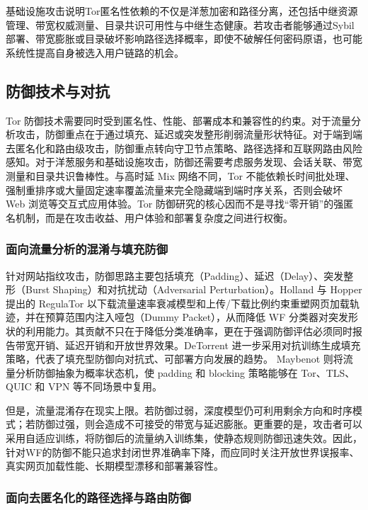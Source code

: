 基础设施攻击说明Tor匿名性依赖的不仅是洋葱加密和路径分离，还包括中继资源管理、带宽权威测量、目录共识可用性与中继生态健康。若攻击者能够通过Sybil部署、带宽膨胀或目录破坏影响路径选择概率，即使不破解任何密码原语，也可能系统性提高自身被选入用户链路的机会。

\subsection{防御技术与对抗}

Tor 防御技术需要同时受到匿名性、性能、部署成本和兼容性的约束。对于流量分析攻击，防御重点在于通过填充、延迟或突发整形削弱流量形状特征。对于端到端去匿名化和路由级攻击，防御重点转向守卫节点策略、路径选择和互联网路由风险感知。对于洋葱服务和基础设施攻击，防御还需要考虑服务发现、会话关联、带宽测量和目录共识鲁棒性。与高时延 Mix 网络不同，Tor 不能依赖长时间批处理、强制重排序或大量固定速率覆盖流量来完全隐藏端到端时序关系，否则会破坏 Web 浏览等交互式应用体验。Tor 防御研究的核心因而不是寻找“零开销”的强匿名机制，而是在攻击收益、用户体验和部署复杂度之间进行权衡。

\subsubsection{面向流量分析的混淆与填充防御}

针对网站指纹攻击，防御思路主要包括填充（Padding）、延迟（Delay）、突发整形（Burst Shaping）和对抗扰动（Adversarial Perturbation）。Holland 与 Hopper 提出的 RegulaTor 以下载流量速率衰减模型和上传/下载比例约束重塑网页加载轨迹，并在预算范围内注入哑包（Dummy Packet），从而降低 WF 分类器对突发形状的利用能力\cite{holland2020regulator}。其贡献不只在于降低分类准确率，更在于强调防御评估必须同时报告带宽开销、延迟开销和开放世界效果。DeTorrent 进一步采用对抗训练生成填充策略，代表了填充型防御向对抗式、可部署方向发展的趋势\cite{holland2023detorrent}。 Maybenot 则将流量分析防御抽象为概率状态机，使 padding 和 blocking 策略能够在 Tor、TLS、QUIC 和 VPN 等不同场景中复用\cite{pulls2023maybenot}。

但是，流量混淆存在现实上限。若防御过弱，深度模型仍可利用剩余方向和时序模式；若防御过强，则会造成不可接受的带宽与延迟膨胀。更重要的是，攻击者可以采用自适应训练，将防御后的流量纳入训练集，使静态规则防御迅速失效。因此，针对WF的防御不能只追求封闭世界准确率下降，而应同时关注开放世界误报率、真实网页加载性能、长期模型漂移和部署兼容性。

\subsubsection{面向去匿名化的路径选择与路由防御}

